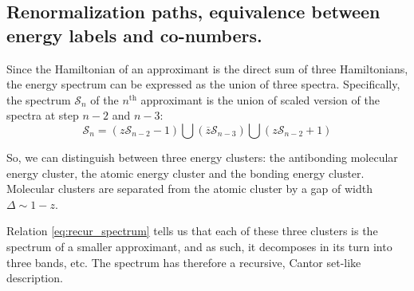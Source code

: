 \documentclass[11pt]{article}
\newcommand{\zb}{\ensuremath{\overline{z}}}
\begin{document}
\subsection{Renormalization paths, equivalence between energy labels and co-numbers.}



Since the Hamiltonian of an approximant is the direct sum of three Hamiltonians, the energy spectrum can be expressed as the union of three spectra.
Specifically, the spectrum $\mathcal{S}_n$ of the $n^\text{th}$ approximant is the union of scaled version of the spectra at step $n-2$ and $n-3$:
\begin{equation}
\label{eq:recur_spectrum}
	\mathcal{S}_n = \left( z \mathcal{S}_{n-2} - 1 \right) \bigcup \left( \zb \mathcal{S}_{n-3} \right) \bigcup \left( z \mathcal{S}_{n-2} + 1 \right) 
\end{equation}

So, we can distinguish between three energy clusters: the antibonding molecular energy cluster, the atomic energy cluster and the bonding energy cluster. Molecular clusters are separated from the atomic cluster by a gap of width $\Delta \sim 1 - z$.

Relation \eqref{eq:recur_spectrum} tells us that each of these three clusters is the spectrum of a smaller approximant, and as such, it decomposes in its turn into three bands, etc.
The spectrum has therefore a recursive, Cantor set-like description.
\end{document}

